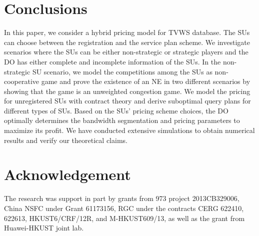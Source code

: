 \documentclass[journal]{IEEEtran}
\begin{document}
\section{Conclusions}
\label{sec:conclusion}

In this paper, we consider a hybrid pricing model for TVWS database. The SUs can choose between the registration and the service plan scheme. We investigate scenarios where the SUs can be either non-strategic or strategic players and the DO has either complete and incomplete information of the SUs. In the non-strategic SU scenario, we model the competitions among the SUs as non-cooperative game and prove the existence of an NE in two different scenarios by showing that the game is an unweighted congestion game. We model the pricing for unregistered SUs with contract theory and derive suboptimal query plans for different types of SUs. Based on the SUs' pricing scheme choices, the DO optimally determines the bandwidth segmentation and pricing parameters to maximize its profit. We have conducted extensive simulations to obtain numerical results and verify our theoretical claims.

\section*{Acknowledgement}
The research was support in part by grants from 973 project 2013CB329006, China NSFC under Grant 61173156, RGC under the contracts CERG 622410, 622613, HKUST6/CRF/12R, and M-HKUST609/13, as well as the grant from Huawei-HKUST joint lab.
\end{document}
